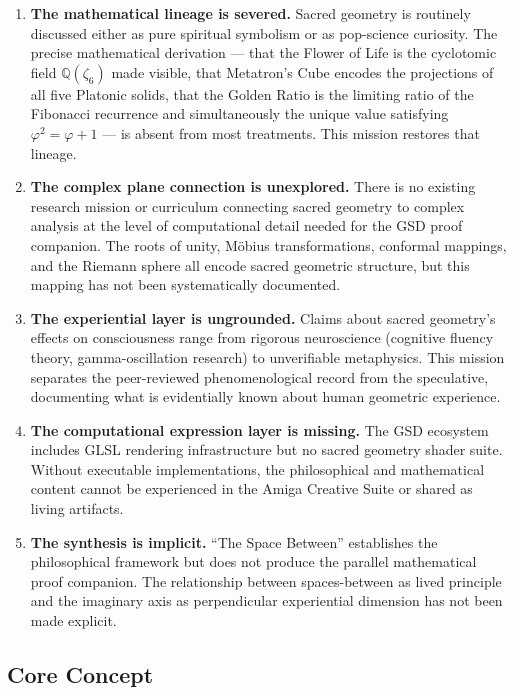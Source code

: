 \documentclass[11pt,letterpaper]{article}
\begin{document}
\begin{enumerate}
  \item \textbf{The mathematical lineage is severed.} Sacred geometry is routinely discussed either as pure spiritual symbolism or as pop-science curiosity. The precise mathematical derivation --- that the Flower of Life is the cyclotomic field $\mathbb{Q}(\zeta_6)$ made visible, that Metatron's Cube encodes the projections of all five Platonic solids, that the Golden Ratio is the limiting ratio of the Fibonacci recurrence and simultaneously the unique value satisfying $\varphi^2 = \varphi + 1$ --- is absent from most treatments. This mission restores that lineage.

  \item \textbf{The complex plane connection is unexplored.} There is no existing research mission or curriculum connecting sacred geometry to complex analysis at the level of computational detail needed for the GSD proof companion. The roots of unity, M\"{o}bius transformations, conformal mappings, and the Riemann sphere all encode sacred geometric structure, but this mapping has not been systematically documented.

  \item \textbf{The experiential layer is ungrounded.} Claims about sacred geometry's effects on consciousness range from rigorous neuroscience (cognitive fluency theory, gamma-oscillation research) to unverifiable metaphysics. This mission separates the peer-reviewed phenomenological record from the speculative, documenting what is evidentially known about human geometric experience.

  \item \textbf{The computational expression layer is missing.} The GSD ecosystem includes GLSL rendering infrastructure but no sacred geometry shader suite. Without executable implementations, the philosophical and mathematical content cannot be experienced in the Amiga Creative Suite or shared as living artifacts.

  \item \textbf{The synthesis is implicit.} ``The Space Between'' establishes the philosophical framework but does not produce the parallel mathematical proof companion. The relationship between spaces-between as lived principle and the imaginary axis as perpendicular experiential dimension has not been made explicit.
\end{enumerate}

\subsection{Core Concept}
\end{document}
